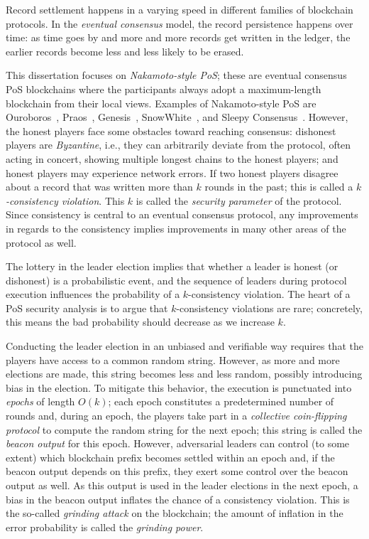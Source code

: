 Record settlement happens in a varying speed in 
different families of blockchain protocols.
In the \emph{eventual consensus} model, 
the record persistence happens over time: 
as time goes by and more and more records get written in the ledger, 
the earlier records become less and less likely to be erased. 

This dissertation focuses on \emph{Nakamoto-style PoS}; 
these are eventual consensus PoS blockchains where the participants 
always adopt a maximum-length blockchain from their local views. 
Examples of Nakamoto-style PoS are Ouroboros~\cite{Ouroboros}, Praos~\cite{Praos}, 
Genesis~\cite{Genesis}, SnowWhite~\cite{SnowWhite}, 
and Sleepy Consensus~\cite{Sleepy}.
However, the honest players face some obstacles toward reaching consensus: 
dishonest players are \emph{Byzantine}, i.e., 
they can arbitrarily deviate from the protocol, 
often acting in concert, 
showing multiple longest chains to the honest players;
and honest players may experience network errors. 
If two honest players disagree about a record that was 
written more than $k$ rounds in the past;
this is called a \emph{$k$-consistency violation}. 
This $k$ is called the \emph{security parameter} of the protocol.
Since consistency is central to an eventual consensus protocol, 
any improvements in regards to the consistency implies 
improvements in many other areas of the protocol as well.


The lottery in the leader election implies that 
whether a leader is honest (or dishonest) is a probabilistic event, 
and the sequence of leaders during protocol execution 
influences the probability of a $k$-consistency violation.
The heart of a PoS security analysis is to argue that $k$-consistency violations are rare; 
concretely, this means the bad probability should decrease as we increase $k$. 

Conducting the leader election in an unbiased and verifiable way 
requires that the players have access to a common random string. 
However, as more and more elections are made, 
this string becomes less and less random, possibly introducing bias in the election. 
To mitigate this behavior, 
the execution is punctuated into \emph{epochs} of length $O(k)$; 
each epoch constitutes a predetermined number of rounds 
and, during an epoch, 
the players take part in a \emph{collective coin-flipping protocol} 
to compute the random string for the next epoch; 
this string is called the \emph{beacon output} for this epoch.
However, adversarial leaders can control (to some extent) 
which blockchain prefix becomes settled within an epoch and, 
if the beacon output depends on this prefix,  
they exert some control over the beacon output as well. 
As this output is used in the leader elections in the next epoch, 
a bias in the beacon output inflates the chance of a consistency violation. 
This is the so-called \emph{grinding attack} on the blockchain; 
the amount of inflation in the error probability is called the \emph{grinding power}.


